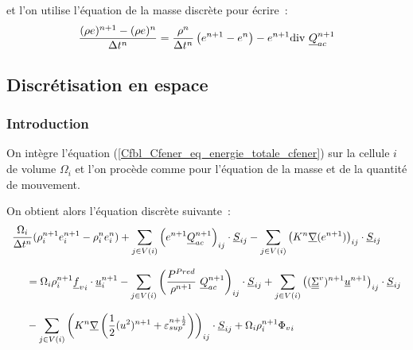 et l'on utilise l'équation de la masse discrète pour écrire~:
\begin{equation}
\displaystyle
\frac{(\rho e)^{n+1} - (\rho e)^n}{\Delta t^n}
=
\frac{\rho^{n}}{\Delta t^n}\left(e^{n+1} - e^n\right)-
e^{n+1}\text{div}\,\,\underline{Q}_{ac}^{n+1}
\end{equation}



\subsection*{Discrétisation en espace}


\subsubsection*{Introduction}

On intègre l'équation (\ref{Cfbl_Cfener_eq_energie_totale_cfener})
sur la cellule $i$ de volume $\Omega_i$ et l'on procède comme
pour l'équation de la masse et de la quantité de mouvement.

On obtient alors l'équation discrète
suivante~:
\begin{equation}\label{Cfbl_Cfener_eq_energie_totale_discrete_cfener}
\begin{array}{l}
\displaystyle\frac{\Omega_i}{\Delta t^n}
(\rho_i^{n+1} e_i^{n+1}-\rho_i^n e_i^n)
+ \displaystyle\sum\limits_{j\in V(i)}
\left(e^{n+1} \underline{Q}_{ac}^{n+1}\right)_{ij} \cdot \underline{S}_{ij}
- \displaystyle\sum\limits_{j\in V(i)}
\left(K^n\underline{\nabla}(e^{n+1})\right)_{ij}\cdot\underline{S}_{ij}\\
\\
\text{\ \ \ \ } = \Omega_i\rho_i^{n+1} {\underline{f}_v}_i \cdot \underline{u}_i^{n+1}
- \displaystyle\sum\limits_{j\in V(i)}
\left(\displaystyle\frac{P^{Pred}}{\rho^{n+1}}\
\underline{Q}_{ac}^{n+1}\right)_{ij} \cdot \underline{S}_{ij}
+ \displaystyle\sum\limits_{j\in V(i)}
\left((\underline{\underline{\Sigma}}^v)^{n+1} \underline{u}^{n+1} \right)_{ij}\cdot \underline{S}_{ij}\\
\\
\text{\ \ \ \ } - \displaystyle\sum\limits_{j\in V(i)}
\left(K^n \underline{\nabla}\left(\frac{1}{2}(u^2)^{n+1}
+ \varepsilon_{sup}^{n+\frac{1}{2}}\right)\right)_{ij}\cdot\underline{S}_{ij}
+ \Omega_i\rho_i^{n+1}{\Phi_v}_i\\
\end{array}
\end{equation}


